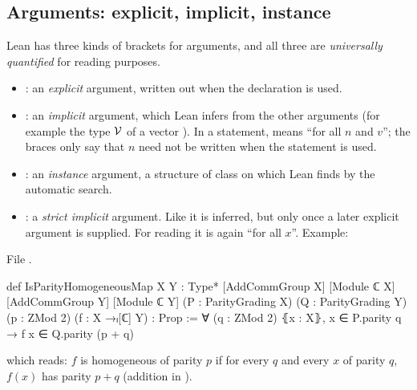\subsection{Arguments: explicit, implicit, instance}

Lean has three kinds of brackets for arguments, and all three are \emph{universally quantified} for
reading purposes.
\begin{itemize}
\item {}: an \emph{explicit} argument, written out when the declaration is used.
\item {}: an \emph{implicit} argument, which Lean infers from the other arguments (for
  example the type $\mathcal{V}$ of a vector ). In a statement, 
  means ``for all $n$ and $v$''; the braces only say that $n$ need not be written when the statement
  is used.
\item \lean{[C X]}: an \emph{instance} argument, a structure of class  on  which Lean
  finds by the automatic search.
\item {}: a \emph{strict implicit} argument. Like  it is inferred, but only
  once a later explicit argument is supplied. For reading it is again ``for all $x$''. Example:
\end{itemize}
\noindent File .
\begin{leancode}
def IsParityHomogeneousMap {X Y : Type*} [AddCommGroup X] [Module ℂ X]
    [AddCommGroup Y] [Module ℂ Y] (P : ParityGrading X) (Q : ParityGrading Y)
    (p : ZMod 2) (f : X →ₗ[ℂ] Y) : Prop :=
  ∀ (q : ZMod 2) ⦃x : X⦄, x ∈ P.parity q → f x ∈ Q.parity (p + q)
\end{leancode}
which reads: $f$ is homogeneous of parity $p$ if for every $q$ and every $x$ of parity $q$, $f(x)$ has
parity $p+q$ (addition in ).

